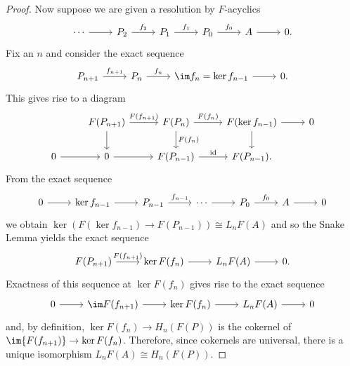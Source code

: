 \documentclass[10pt]{amsart}
\begin{document}
\begin{ex}
\begin{proof}
    Now suppose we are given a resolution by $F$-acyclics
    $$\begin{tikzcd}
      \cdots \arrow{r} & P_2 \arrow{r}{f_2} & P_1 \arrow{r}{f_1} & P_0 \arrow{r}{f_0} & A \arrow{r} & 0.
    \end{tikzcd}$$
    Fix an $n$ and consider the exact sequence
    $$\begin{tikzcd}
      P_{n+1} \arrow{r}{f_{n+1}} & P_{n} \arrow{r}{f_n} & \im f_n = \ker f_{n-1} \arrow{r} & 0.
    \end{tikzcd}$$
    This gives rise to a diagram
    $$\begin{tikzcd}
      & F(P_{n+1}) \arrow{r}{F(f_{n+1})} \arrow{d} & F(P_n) \arrow{r}{F(f_{n})} \arrow{d}{F(f_n)} & F(\ker f_{n-1}) \arrow{d}\arrow{r} & 0\\
      0 \arrow{r} & 0 \arrow{r} & F(P_{n-1}) \arrow{r}{\operatorname{id}} & F(P_{n-1}). & 
    \end{tikzcd}$$
    From the exact sequence
    $$\begin{tikzcd}
      0 \arrow{r} & \ker f_{n-1} \arrow{r} & P_{n-1} \arrow{r}{f_{n-1}} & \cdots \arrow{r} & P_0 \arrow{r}{f_0} & A \arrow{r} & 0
    \end{tikzcd}$$
    we obtain $\ker(F(\ker f_{n-1}) \rightarrow F(P_{n-1})) \cong L_nF(A)$ and so the Snake Lemma yields the exact sequence
    $$\begin{tikzcd}
      F(P_{n+1}) \arrow{r}{F(f_{n+1})} & \ker F(f_n) \arrow{r} & L_nF(A) \arrow{r} & 0.
     \end{tikzcd}$$
    Exactness of this sequence at $\ker{F(f_n)}$ gives rise to the exact sequence
     $$\begin{tikzcd}
       0 \arrow{r} & \im F(f_{n+1}) \arrow{r} & \ker F(f_n) \arrow{r} & L_nF(A) \arrow{r} & 0
    \end{tikzcd}$$
    and, by definition, $\ker{F(f_n)} \rightarrow H_n(F(P))$ is the cokernel of $\im{F(f_{n+1})} \rightarrow \ker{F(f_n)}$.
     Therefore, since cokernels are universal, there is a unique isomorphism $L_nF(A) \cong H_n(F(P))$.
  \end{proof}
\end{ex}
\end{document}
